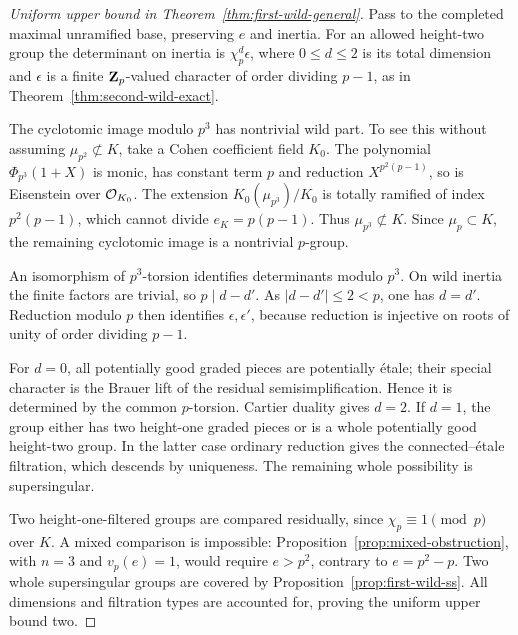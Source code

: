 \begin{proof}[Uniform upper bound in Theorem~\ref{thm:first-wild-general}]
Pass to the completed maximal unramified base, preserving $e$ and inertia. For an allowed height-two group the determinant on inertia is $\chi_p^d\epsilon$, where $0\le d\le2$ is its total dimension and $\epsilon$ is a finite $\mathbf Z_p$-valued character of order dividing $p-1$, as in Theorem~\ref{thm:second-wild-exact}.

The cyclotomic image modulo $p^3$ has nontrivial wild part. To see this without assuming $\mu_{p^2}\not\subset K$, take a Cohen coefficient field $K_0$. The polynomial $\Phi_{p^3}(1+X)$ is monic, has constant term $p$ and reduction $X^{p^2(p-1)}$, so is Eisenstein over $\mathcal O_{K_0}$. The extension $K_0(\mu_{p^3})/K_0$ is totally ramified of index $p^2(p-1)$, which cannot divide $e_K=p(p-1)$. Thus $\mu_{p^3}\not\subset K$. Since $\mu_p\subset K$, the remaining cyclotomic image is a nontrivial $p$-group.

An isomorphism of $p^3$-torsion identifies determinants modulo $p^3$. On wild inertia the finite factors are trivial, so $p\mid d-d'$. As $|d-d'|\le2<p$, one has $d=d'$. Reduction modulo $p$ then identifies $\epsilon,\epsilon'$, because reduction is injective on roots of unity of order dividing $p-1$.

For $d=0$, all potentially good graded pieces are potentially \'etale; their special character is the Brauer lift of the residual semisimplification. Hence it is determined by the common $p$-torsion. Cartier duality gives $d=2$. If $d=1$, the group either has two height-one graded pieces or is a whole potentially good height-two group. In the latter case ordinary reduction gives the connected--\'etale filtration, which descends by uniqueness. The remaining whole possibility is supersingular.

Two height-one-filtered groups are compared residually, since $\chi_p\equiv1\pmod p$ over $K$. A mixed comparison is impossible: Proposition~\ref{prop:mixed-obstruction}, with $n=3$ and $v_p(e)=1$, would require $e>p^2$, contrary to $e=p^2-p$. Two whole supersingular groups are covered by Proposition~\ref{prop:first-wild-ss}. All dimensions and filtration types are accounted for, proving the uniform upper bound two.
\end{proof}

